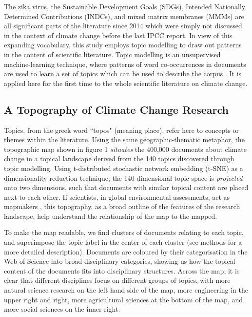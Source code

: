 \documentclass{article}
\begin{document}
\begin{linenumbers}
The zika virus, the Sustainable Development Goals (SDGs), Intended Nationally Determined Contributions (INDCs), and mixed matrix membranes (MMMs) are all significant parts of the literature since 2014 which were simply not discussed in the context of climate change before the last IPCC report. In view of this expanding vocabulary, this study employs topic modelling to draw out patterns in the content of scientific literature. Topic modelling is an unsupervised machine-learning technique, where patterns of word co-occurrences in documents are used to learn a set of topics which can be used to describe the corpus \cite{Blei2012}. It is applied here for the first time to the whole scientific literature on climate change.

\subsection*{A Topography of Climate Change Research}

Topics, from the greek word ``topos" (meaning place), refer here to concepts or themes within the literature. Using the same geographic-thematic metaphor, the topographic map shown in figure 1 \textit{situates} the 400,000 documents about climate change in a topical landscape derived from the 140 topics discovered through topic modelling. Using t-distributed stochastic network embedding \cite{vandermaaten2008} (t-SNE) as a dimensionality reduction technique, the 140 dimensional topic space is \textit{projected} onto two dimensions, such that documents with similar topical content are placed next to each other. If scientists, in global environmental assessments, act as mapmakers \cite{Edenhofer2015}, this topography, as a broad outline of the features of the research landscape, help understand the relationship of the map to the mapped.

To make the map readable, we find clusters of documents relating to each topic, and superimpose the topic label in the center of each cluster (see methods for a more detailed description). Documents are coloured by their categorisation in the Web of Science into broad disciplinary categories, showing us how the topical content of the documents fits into disciplinary structures. Across the map, it is clear that different disciplines focus on different groups of topics, with more natural science research on the left hand side of the map, more engineering in the upper right and right, more agricultural sciences at the bottom of the map, and more social sciences on the inner right.


\end{linenumbers}
\end{document}
